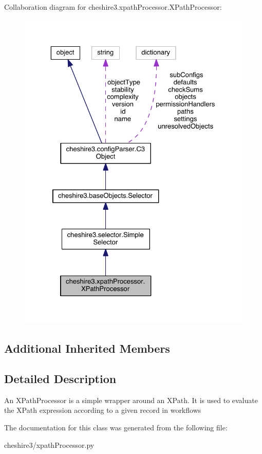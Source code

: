 Collaboration diagram for cheshire3.\-xpath\-Processor.\-X\-Path\-Processor\-:
\nopagebreak
\begin{figure}[H]
\begin{center}
\leavevmode
\includegraphics[width=325pt]{classcheshire3_1_1xpath_processor_1_1_x_path_processor__coll__graph}
\end{center}
\end{figure}
\subsection*{Additional Inherited Members}


\subsection{Detailed Description}
\begin{DoxyVerb}An XPathProcessor is a simple wrapper around an XPath.  It is used
to evaluate the XPath expression according to a given record in
workflows\end{DoxyVerb}
 

The documentation for this class was generated from the following file\-:\begin{DoxyCompactItemize}
\item 
cheshire3/xpath\-Processor.\-py\end{DoxyCompactItemize}
